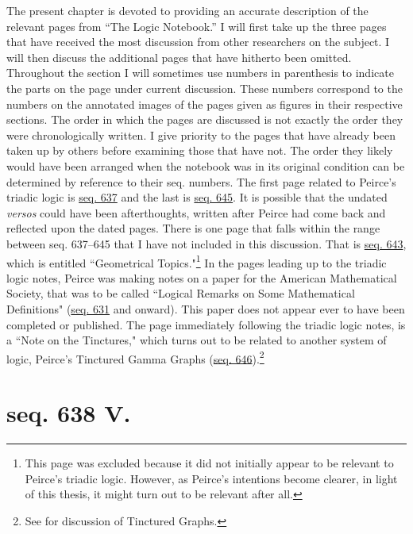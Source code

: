 The present chapter is devoted to providing an accurate description of the relevant pages from ``The Logic Notebook.'' I will first take up the three pages that have received the most discussion from other researchers on the subject. I will then discuss the additional pages that have hitherto been omitted. Throughout the section I will sometimes use numbers in parenthesis to indicate the parts on the page under current discussion. These numbers correspond to the numbers on the annotated images of the pages given as figures in their respective sections. The order in which the pages are discussed is not exactly the order they were chronologically written. I give priority to the pages that have already been taken up by others before examining those that have not. The order they likely would have been arranged when the notebook was in its original condition can be determined by reference to their seq. numbers. The first page related to Peirce's triadic logic is \href{https://iiif.lib.harvard.edu/manifests/view/drs:15255301$637i}{seq. 637} and the last is \href{https://iiif.lib.harvard.edu/manifests/view/drs:15255301$645i}{seq. 645}. It is possible that the undated \textit{versos} could have been afterthoughts, written after Peirce had come back and reflected upon the dated pages. There is one page that falls within the range between seq. 637--645 that I have not included in this discussion. That is \href{https://iiif.lib.harvard.edu/manifests/view/drs:15255301$643i}{seq. 643}, which is entitled ``Geometrical Topics."\footnote{This page was excluded because it did not initially appear to be relevant to Peirce's triadic logic. However, as Peirce's intentions become clearer, in light of this thesis, it might turn out to be relevant after all.} In the pages leading up to the triadic logic notes, Peirce was making notes on a paper for the American Mathematical Society, that was to be called ``Logical Remarks on Some Mathematical Definitions" (\href{https://iiif.lib.harvard.edu/manifests/view/drs:15255301$631i}{seq. 631} and onward). This paper does not appear ever to have been completed or published. The page immediately following the triadic logic notes, is a ``Note on the Tinctures," which turns out to be related to another system of logic, Peirce's Tinctured Gamma Graphs (\href{https://iiif.lib.harvard.edu/manifests/view/drs:15255301$646i}{seq. 646}).\footnote{See \cite{pietarinen_peirces_2006} for discussion of Tinctured Graphs.}

\section{seq. 638 V.}

